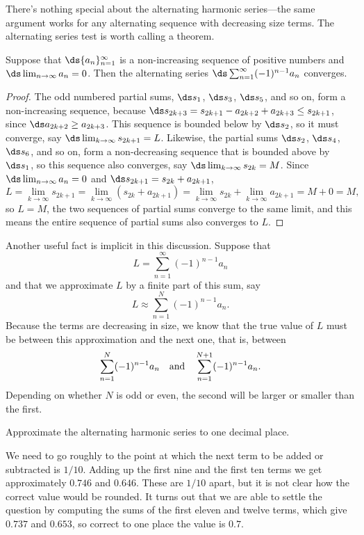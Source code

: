 There's nothing special about the alternating harmonic series---the
same argument works for any alternating sequence with decreasing size
terms. The alternating series test is worth calling a theorem.

\begin{theorem} Suppose that $\ds\{a_n\}_{n=1}^\infty$ is a non-increasing
sequence of positive numbers and $\ds\lim_{n\to\infty}a_n=0$. Then the
alternating series $\ds\sum_{n=1}^\infty (-1)^{n-1} a_n$ converges.
\end{theorem}

\begin{proof} The odd numbered partial sums, $\ds s_1$, $\ds s_3$, $\ds s_5$,
and so on, form a non-increasing sequence, because
$\ds s_{2k+3}=s_{2k+1}-a_{2k+2}+a_{2k+3}\le s_{2k+1}$, since
$\ds a_{2k+2}\ge a_{2k+3}$. This sequence is bounded below by
$\ds s_2$, so it must converge, say 
$\ds\lim_{k\to\infty}s_{2k+1}=L$.
Likewise, the partial sums $\ds s_2$, $\ds s_4$, $\ds s_6$,
and so on, form a non-decreasing sequence that is bounded above by
$\ds s_1$, so this sequence also converges, say 
$\ds\lim_{k\to\infty}s_{2k}=M$. Since $\ds\lim_{n\to\infty} a_n=0$ and
$\ds s_{2k+1}= s_{2k}+a_{2k+1}$,
$$
  L=\lim_{k\to\infty}s_{2k+1}=\lim_{k\to\infty}(s_{2k}+a_{2k+1})=
  \lim_{k\to\infty}s_{2k}+\lim_{k\to\infty}a_{2k+1}=M+0=M,
$$
so $L=M$, the two sequences of partial sums converge to the same
limit, and this means the entire sequence of partial sums also
converges to $L$.
\end{proof}

Another useful fact is implicit in this discussion. Suppose that 
$$L=\sum_{n=1}^\infty (-1)^{n-1} a_n$$
and that we approximate $L$ by a finite part of this sum, say
$$L\approx \sum_{n=1}^N (-1)^{n-1} a_n.$$
Because the terms are decreasing in size, we know that the true value
of $L$ must be between this approximation and the next one, that is,
between 
$$
  \sum_{n=1}^N (-1)^{n-1} a_n \hbox{\quad and\quad}
  \sum_{n=1}^{N+1} (-1)^{n-1} a_n.
$$
Depending on whether $N$ is odd or even, the second will be larger or
smaller than the first.

\begin{example}
Approximate the alternating harmonic series to one decimal place.

We need to go roughly to the point at which the next term to be added
or subtracted is $1/10$. Adding up the first nine and the first ten
terms we get approximately $0.746$ and $0.646$. These are $1/10$
apart, but it is not clear how the correct value would be rounded. It
turns out that we are able to settle the question by computing the
sums of the first eleven and twelve terms, which give
$0.737$ and $0.653$, so correct to one place the value is $0.7$.
\end{example}

